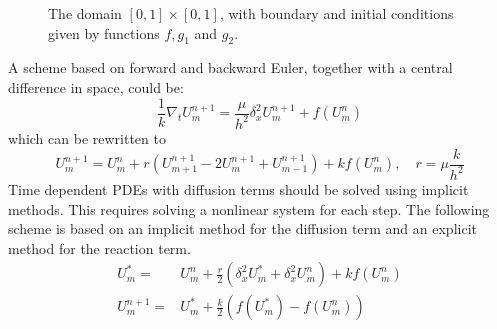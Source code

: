 \begin{figure}[!h]
  \centering
  \label{fig:disc}
  \caption{The domain \( [0, 1] \times [0, 1] \),
    with boundary and initial conditions
    given by functions \( f, g_1 \) and \( g_2 \).
  }
\end{figure}

A scheme based on forward and backward Euler,
together with a central difference in space, could be:
$$
  \frac{1}{k}\nabla_tU_{m}^{n+1}=\frac{\mu}{h^2}\delta_x^2U_{m}^{n+1}+f(U_{m}^{n} )
$$
which can be rewritten to 
\begin{equation}
  \label{eq:scheme}
  U_{m}^{n+1} = U_{m}^{n} + r (U_{m+1}^{n+1}-2U_{m}^{n+1}+U_{m-1}^{n+1}) + kf(U_{m}^{n}), \quad r = \mu\frac{k}{h^2}
\end{equation}
Time dependent PDEs with diffusion terms should be solved using implicit methods.
This requires solving a nonlinear system for each step.
The following scheme is based on an implicit method
for the diffusion term and an explicit method for the reaction term.
\begin{align}
  \label{eq:scheme_implicit_eq}
    U_{m}^{*} =& U_{m}^{n} +\frac{r}{2}(\delta_x^2 U_{m}^{*} + \delta_x^2 U_{m}^{n} ) + kf(U_{m}^{n}) \\
  \label{eq:scheme_explicit_eq}
    U_{m}^{n+1} =& U_{m}^{*} + \frac{k}{2}(f(U_{m}^{*}) - f(U_{m}^{n}))
\end{align}

